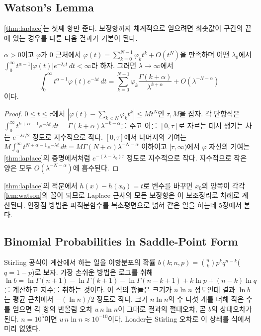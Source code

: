 \subsection{Watson's Lemma}

\cref{thm:laplace}는 첫째 항만 준다. 보정항까지 체계적으로 얻으려면 최솟값이 구간의 끝에 있는 경우를 다룬 다음 결과가 기본이 된다\cite{olver1974asymptotics}.

\begin{lemma}[Watson]
\label{lem:watson}
$\alpha>0$이고 $\varphi$가 $0$ 근처에서 $\varphi(t)=\sum_{k=0}^{N-1}\varphi_kt^k+O(t^N)$을 만족하며 어떤 $\lambda_0$에서 $\int_0^\infty t^{\alpha-1}|\varphi(t)|e^{-\lambda_0t}\,dt<\infty$라 하자. 그러면 $\lambda\to\infty$에서
\[
\int_0^\infty t^{\alpha-1}\varphi(t)e^{-\lambda t}\,dt=\sum_{k=0}^{N-1}\varphi_k\frac{\Gamma(k+\alpha)}{\lambda^{k+\alpha}}+O(\lambda^{-N-\alpha})
\]
이다.
\end{lemma}

\begin{proof}
$0\le t\le\tau$에서 $|\varphi(t)-\sum_{k<N}\varphi_kt^k|\le Mt^N$인 $\tau,M$을 잡자. 각 단항식은 $\int_0^\infty t^{k+\alpha-1}e^{-\lambda t}\,dt=\Gamma(k+\alpha)\lambda^{-k-\alpha}$를 주고 이를 $[0,\tau]$로 자르는 데서 생기는 차는 $e^{-\lambda\tau/2}$ 정도로 지수적으로 작다. $[0,\tau]$에서 나머지의 기여는 $M\int_0^\infty t^{N+\alpha-1}e^{-\lambda t}\,dt=M\Gamma(N+\alpha)\lambda^{-N-\alpha}$ 이하이고 $[\tau,\infty)$에서 $\varphi$ 자신의 기여는 \cref{thm:laplace}의 증명에서처럼 $e^{-(\lambda-\lambda_0)\tau}$ 정도로 지수적으로 작다. 지수적으로 작은 양은 모두 $O(\lambda^{-N-\alpha})$에 흡수된다.
\end{proof}

\cref{thm:laplace}의 적분에서 $h(x)-h(x_0)=t$로 변수를 바꾸면 $x_0$의 양쪽이 각각 \cref{lem:watson}의 꼴이 되므로 Laplace 근사의 모든 보정항은 이 보조정리로 차례로 계산된다. 안장점 방법은 피적분함수를 복소평면으로 넓혀 같은 일을 하는데 5장에서 본다.

\subsection{Binomial Probabilities in Saddle-Point Form}

Stirling 공식이 계산에서 하는 일을 이항분포의 확률 $b(k;n,p)=\binom nkp^kq^{n-k}$($q=1-p$)로 보자. 가장 손쉬운 방법은 로그를 취해
\[
\ln b=\ln\Gamma(n+1)-\ln\Gamma(k+1)-\ln\Gamma(n-k+1)+k\ln p+(n-k)\ln q
\]
를 계산하고 지수를 취하는 것이다. 이 식의 항들은 크기가 $n\ln n$ 정도인데 결과 $\ln b$는 평균 근처에서 $-(\ln n)/2$ 정도로 작다. 크기 $n\ln n$의 수 다섯 개를 더해 작은 수를 얻으면 각 항의 반올림 오차 $u\,n\ln n$이 그대로 결과의 절대오차, 곧 $b$의 상대오차가 된다. $n=10^5$이면 $u\,n\ln n\approx10^{-10}$이다. Loader는 Stirling 오차로 이 상쇄를 식에서 미리 없앴다\cite{loader2000binomial}.


